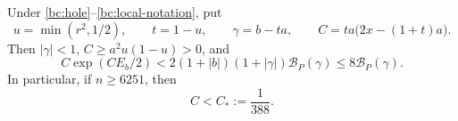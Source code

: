 \begin{lemma}\label{bc:blaschke}
Under \eqref{bc:hole}--\eqref{bc:local-notation}, put
\begin{equation}\label{bc:adaptive-def}
 u=\min(r^2,1/2),\qquad t=1-u,\qquad
 \gamma=b-ta,\qquad C=ta\bigl(2x-(1+t)a\bigr).
\end{equation}
Then $|\gamma|<1$, $C\geq a^2u(1-u)>0$, and
\begin{equation}\label{bc:blaschke-bound}
 C\exp(CE_b/2)
 <2(1+|b|)(1+|\gamma|)\mathcal B_P(\gamma)
 \leq8\mathcal B_P(\gamma).
\end{equation}
In particular, if $n\geq6251$, then
\begin{equation}\label{bc:Ccap}
 C<C_*:=\frac1{388}.
\end{equation}
\end{lemma}


